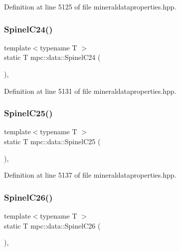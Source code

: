 Definition at line 5125 of file mineraldataproperties.\+hpp.

\mbox{\label{namespacempc_1_1data_a5c6c5541db89218df3b498ac10172a48}} 
\subsubsection{\texorpdfstring{Spinel\+C24()}{SpinelC24()}}
{\footnotesize\ttfamily template$<$typename T $>$ \\
static T mpc\+::data\+::\+Spinel\+C24 (\begin{DoxyParamCaption}{ }\end{DoxyParamCaption})\hspace{0.3cm}{\ttfamily [inline]}, {\ttfamily [static]}}



Definition at line 5131 of file mineraldataproperties.\+hpp.

\mbox{\label{namespacempc_1_1data_ab708cfdd534861ef94710f9cc0fef33e}} 
\subsubsection{\texorpdfstring{Spinel\+C25()}{SpinelC25()}}
{\footnotesize\ttfamily template$<$typename T $>$ \\
static T mpc\+::data\+::\+Spinel\+C25 (\begin{DoxyParamCaption}{ }\end{DoxyParamCaption})\hspace{0.3cm}{\ttfamily [inline]}, {\ttfamily [static]}}



Definition at line 5137 of file mineraldataproperties.\+hpp.

\mbox{\label{namespacempc_1_1data_a4b75eb7b50dd2cfdca2878244a53d82f}} 
\subsubsection{\texorpdfstring{Spinel\+C26()}{SpinelC26()}}
{\footnotesize\ttfamily template$<$typename T $>$ \\
static T mpc\+::data\+::\+Spinel\+C26 (\begin{DoxyParamCaption}{ }\end{DoxyParamCaption})\hspace{0.3cm}{\ttfamily [inline]}, {\ttfamily [static]}}



